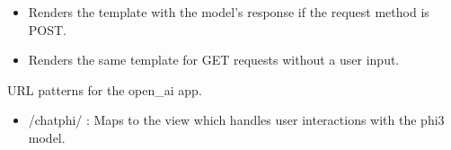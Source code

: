 \documentclass[letterpaper,10pt,english]{sphinxmanual}
\begin{document}
\begin{fulllineitems}
\label{\detokenize{open_ai:get--chatphi-}}
\pysigstartsignatures
{}\label{\detokenize{open_ai:get-Maps to the `chatphi` view. This view handles user input and returns a response from the Ollama Phi3 model.}}
\pysigstopsignatures\begin{description}
\begin{itemize}
\item {} 
\sphinxAtStartPar
Renders the  template with the model’s response if the request method is POST.

\item {} 
\sphinxAtStartPar
Renders the same template for GET requests without a user input.

\end{itemize}

\end{description}

\end{fulllineitems}

\label{\detokenize{open_ai:module-open_ai.urls}}

\begin{fulllineitems}
\label{\detokenize{open_ai:open_ai.urls.urlpatterns}}
\pysigstartsignatures
{}
\pysigstopsignatures
\sphinxAtStartPar
URL patterns for the open\_ai app.
\begin{description}
\begin{itemize}
\item {} 
\sphinxAtStartPar
/chatphi/ : Maps to the  view which handles user interactions with the phi3 model.

\end{itemize}

\end{description}

\end{fulllineitems}
\end{document}
